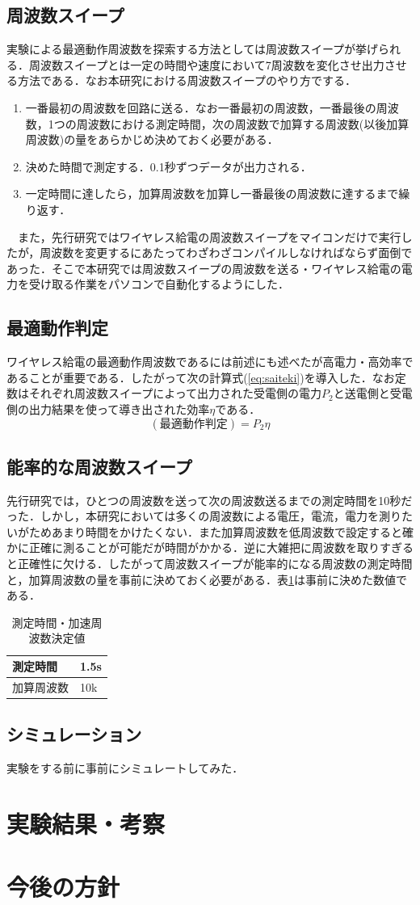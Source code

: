 \documentclass[10pt,a4paper,twocolumn]{jarticle}
\begin{document}
\subsection{周波数スイープ}
実験による最適動作周波数を探索する方法としては周波数スイープが挙げられる．周波数スイープとは一定の時間や速度において7周波数を変化させ出力させる方法である．なお本研究における周波数スイープのやり方でする．
\begin{enumerate}
	\item  一番最初の周波数を回路に送る．なお一番最初の周波数，一番最後の周波数，1つの周波数における測定時間，次の周波数で加算する周波数(以後加算周波数)の量をあらかじめ決めておく必要がある．
	\item 決めた時間で測定する．0.1秒ずつデータが出力される．
	\item 一定時間に達したら，加算周波数を加算し一番最後の周波数に達するまで繰り返す．
\end{enumerate}
　また，先行研究ではワイヤレス給電の周波数スイープをマイコンだけで実行したが，周波数を変更するにあたってわざわざコンパイルしなければならず面倒であった．そこで本研究では周波数スイープの周波数を送る・ワイヤレス給電の電力を受け取る作業をパソコンで自動化するようにした．
\subsection{最適動作判定}
ワイヤレス給電の最適動作周波数であるには前述にも述べたが高電力・高効率であることが重要である．したがって次の計算式(\ref{eq:saiteki})を導入した．なお定数はそれぞれ周波数スイープによって出力された受電側の電力$P_2$と送電側と受電側の出力結果を使って導き出された$効率\eta$である．
\begin{equation}
(最適動作判定)=P_2\eta
\label{eq:saiteki}
\end{equation}
\subsection{能率的な周波数スイープ}
先行研究では，ひとつの周波数を送って次の周波数送るまでの測定時間を10秒だった．しかし，本研究においては多くの周波数による電圧，電流，電力を測りたいがためあまり時間をかけたくない．また加算周波数を低周波数で設定すると確かに正確に測ることが可能だが時間がかかる．逆に大雑把に周波数を取りすぎると正確性に欠ける．したがって周波数スイープが能率的になる周波数の測定時間と，加算周波数の量を事前に決めておく必要がある．表\ref{tab:nouritu}は事前に決めた数値である．
\begin{table}[h]
	\centering

	\caption{測定時間・加速周波数決定値}
	\begin{tabular}{|l|l|}
		\hline
		測定時間  & 1.5s \\ \hline
		加算周波数 & 10k  \\ \hline
	\end{tabular}
\label{tab:nouritu}
\end{table}
\subsection{シミュレーション}
実験をする前に事前にシミュレートしてみた．

\section{実験結果・考察}
\section{今後の方針}
\end{document}
